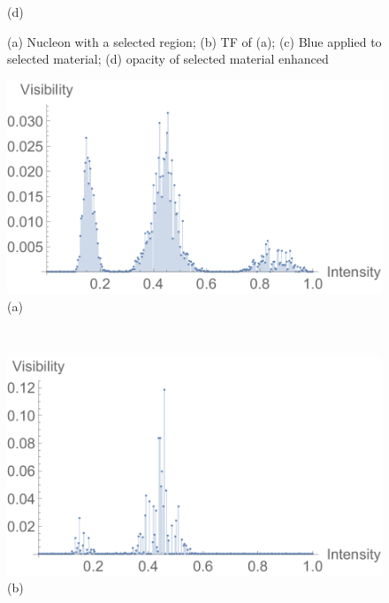 \documentclass[twoside,twocolumn,10pt]{article}
\begin{document}
\begin{figure}[t]
\begin{minipage}{.1\textwidth}
		(d)%
		\label{fig:nucleon_2_alpha}
	\end{minipage}
	\caption{(a) Nucleon with a selected region; (b) TF of (a); (c) Blue applied to selected material; (d) opacity of selected material enhanced}
	\label{fig:nucleon_ori}
\end{figure}

\begin{figure}
	\centering
	\begin{minipage}{.155\textwidth}
		\centering
		\includegraphics[width=1\linewidth]{global_visibility_histogram}
		(a)%
		\label{fig:global_visibility_histogram}
	\end{minipage}~
	\begin{minipage}{.155\textwidth}
		\centering
		\includegraphics[width=1\linewidth]{local_visibility_histogram}
		(b)%

\end{minipage}
\end{figure}
\end{document}
